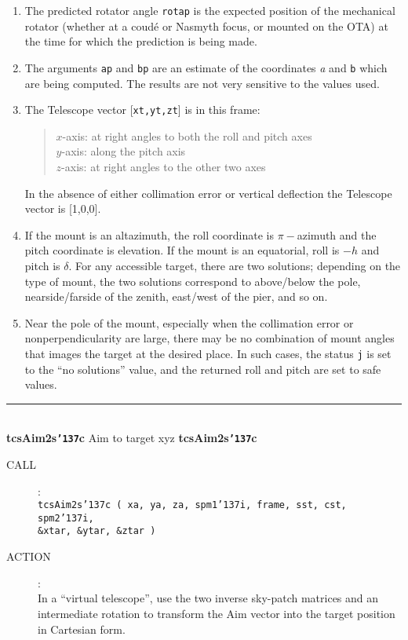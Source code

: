 \documentclass[12pt,fleqn,twoside]{article}
\renewcommand{\_}{{\tt\char'137}}     %
\newcommand{\routine}[2]
{
  \newpage
  \rule{\textwidth}{0.3mm}\\ \nopagebreak
  {\Large {\bf #1} \hfill #2 \hfill {\bf #1}}
  \vspace{-1ex}
}
\newcommand{\call}[1]
{
  \goodbreak
  \begin{description}
    \item[CALL]: \\[0.5ex] \nopagebreak
        {\tt #1}
  \end{description}
  \vspace{-3ex}
}
\newcommand{\action}[1]
{
  \goodbreak
  \begin{description}
    \item[ACTION]: \\[0.5ex] \nopagebreak
        #1
  \end{description}
  \vspace{-3ex}
}
\begin{document}
{\begin{enumerate}
      In the present case, the encoder demands required to image the
      target at the specified pointing-origin are calculated, starting
      from the {\sc Aim} vector.
\item The predicted rotator angle {\tt rotap} is the expected position of
      the mechanical rotator (whether at a coud\'{e} or Nasmyth focus,
      or mounted on the OTA) at the time for which the prediction is
      being made.
\item The arguments {\tt ap} and {\tt bp} are an estimate of the
      coordinates {\it a} and {\tt b} which are being computed.  The
      results are not very sensitive to the values used.
\item The {\sc Telescope} vector [{\tt xt,yt,zt}] is in this frame:
      \begin{quote}
      $x$-axis:  at right angles to both the roll and pitch axes \\
      $y$-axis:  along the pitch axis \\
      $z$-axis:  at right angles to the other two axes
      \end{quote}
      In the absence of either collimation error or vertical deflection
      the {\sc Telescope} vector is [1,0,0].
\item If the mount is an altazimuth, the roll coordinate is $\pi-$azimuth
      and the pitch coordinate is elevation.  If the mount is an
      equatorial, roll is $-h$ and pitch is $\delta$.  For any
      accessible target, there are two solutions; depending on the type
      of mount, the two solutions correspond to above/below the pole,
      nearside/farside of the zenith, east/west of the pier, and so on.
\item Near the pole of the mount, especially when the collimation error
      or nonperpendicularity are large, there may be no combination of
      mount angles that images the target at the desired place.  In
      such cases, the status {\tt j} is set to the
      ``no solutions'' value, and
      the returned roll and pitch are set to safe values.
\end{enumerate}
}
\routine{tcsAim2s\_c}{{\sc Aim} to target xyz}
\label{tcsAim2s_c}
\call{tcsAim2s\_c ( xa, ya, za, spm1\_i, frame, sst, cst, spm2\_i, \\
      \hspace*{6em} \&xtar, \&ytar, \&ztar )}
\action{In a ``virtual telescope'', use the two inverse sky-patch
        matrices and an intermediate rotation to transform the
        {\sc Aim} vector into the target position in Cartesian form.}
\end{document}
